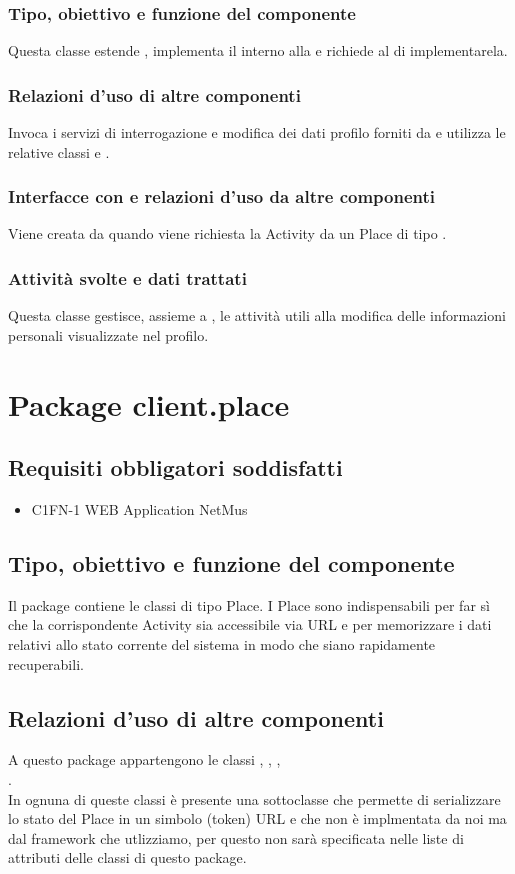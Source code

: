 \subsubsection*{Tipo, obiettivo e funzione del componente}
Questa classe estende , implementa il 
interno alla  e richiede al  di
implementarela.
\subsubsection*{Relazioni d'uso di altre componenti}
Invoca i servizi di interrogazione e modifica dei dati profilo forniti da
 e utilizza le relative classi  e
.
\subsubsection*{Interfacce con e relazioni d'uso da altre componenti}
Viene creata da  quando viene richiesta la Activity da
un Place di tipo .
\subsubsection*{Attivit\`a svolte e dati trattati}
Questa classe gestisce, assieme a , le attivit\`a utili alla
modifica delle informazioni personali visualizzate nel profilo.

\newpage
\section{Package client.place} %
\subsection*{Requisiti obbligatori soddisfatti}
\begin{itemize}
	\item C1FN-1 WEB Application NetMus
\end{itemize}
\subsection*{Tipo, obiettivo e funzione del componente}
Il package contiene le classi di tipo Place. I Place sono indispensabili
per far s\`i che la corrispondente Activity sia accessibile via URL e per
memorizzare i dati relativi allo stato corrente del sistema in modo che siano
rapidamente recuperabili. 
\subsection*{Relazioni d'uso di altre componenti} A
questo package appartengono le classi , ,
, \\.\\
In ognuna di queste classi \`e presente una sottoclasse  che
permette di serializzare lo stato del Place in un simbolo (token) URL e che non
\`e implmentata da noi ma dal framework che utlizziamo, per questo non sar\`a
specificata nelle liste di attributi delle classi di questo package.
